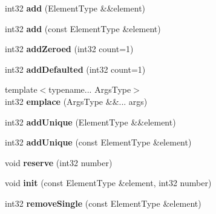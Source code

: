 \begin{DoxyCompactItemize}
\mbox{\label{class_arcana_1_1_array_ab304b41a36510ba79360669fbc44d6dc}} 
int32 {\bfseries add} (Element\+Type \&\&element)
\item 
\mbox{\label{class_arcana_1_1_array_ae441be61af8f65974411f029e1b3be8f}} 
int32 {\bfseries add} (const Element\+Type \&element)
\item 
\mbox{\label{class_arcana_1_1_array_a841aab9774dd15b7af43df40b3045923}} 
int32 {\bfseries add\+Zeroed} (int32 count=1)
\item 
\mbox{\label{class_arcana_1_1_array_a6929485aa23c8c83f05511e043815e60}} 
int32 {\bfseries add\+Defaulted} (int32 count=1)
\item 
\mbox{\label{class_arcana_1_1_array_ac3adf9aa74707ee34c6b2dd017a2e39d}} 
{\footnotesize template$<$typename... Args\+Type$>$ }\\int32 {\bfseries emplace} (Args\+Type \&\&... args)
\item 
\mbox{\label{class_arcana_1_1_array_a4477ce5f16f9ee7455f9679b4361de4b}} 
int32 {\bfseries add\+Unique} (Element\+Type \&\&element)
\item 
\mbox{\label{class_arcana_1_1_array_a7f4b8ee72c384541c1019f3382811a6a}} 
int32 {\bfseries add\+Unique} (const Element\+Type \&element)
\item 
\mbox{\label{class_arcana_1_1_array_a1e2216c39f180f60c567b4b4af811574}} 
void {\bfseries reserve} (int32 number)
\item 
\mbox{\label{class_arcana_1_1_array_ab73da86c74eb92a05f0d6d513b050266}} 
void {\bfseries init} (const Element\+Type \&element, int32 number)
\item 
\mbox{\label{class_arcana_1_1_array_a02c0739f0cce1c5f7d6e65ba718e8acd}} 
int32 {\bfseries remove\+Single} (const Element\+Type \&element)
\item 
\mbox{\label{class_arcana_1_1_array_aa3feaba88749ef4b2c552139a5aac6ba}} 

\end{DoxyCompactItemize}

